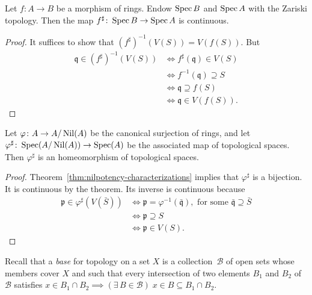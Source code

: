 \begin{thm}
    Let\/ $f\colon A\to B$ be a morphism of rings. Endow\/ $\operatorname{Spec} B$ and\/ $\operatorname{Spec} A$ with the Zariski topology. Then the map\/ $f^\sharp\colon\operatorname{Spec} B\to\operatorname{Spec} A$ is continuous.
\end{thm}

\begin{proof}
    It suffices to show that $(f^\sharp)^{-1}(V(S))=V(f(S))$. But
    \begin{align*}
        \mathfrak q\in(f^\sharp)^{-1}(V(S))
            &\iff f^\sharp(\mathfrak q)\in V(S)\\
            &\iff f^{-1}(\mathfrak q)\supseteq S\\
            &\iff \mathfrak q\supseteq f(S)\\
            &\iff \mathfrak q\in V(f(S)).
    \end{align*}
\end{proof}

\begin{cor}
    Let\/ $\varphi\colon A\to A/\operatorname{Nil}(A)$ be the canonical surjection of rings, and let\/ $\varphi^\sharp\colon\operatorname{Spec}(A/\operatorname{Nil}(A))\to\operatorname{Spec}(A)$ be the associated map of topological spaces. Then\/ $\varphi^\sharp$ is an homeomorphism of topological spaces.    
\end{cor}

\begin{proof}
    Theorem~\ref{thm:nilpotency-characterizations} implies that $\varphi^\sharp$ is a bijection. It is continuous by the theorem. Its inverse is continuous because
    \begin{align*}
        \mathfrak p\in\varphi^\sharp(V(\bar S))
            &\iff \mathfrak p=\varphi^{-1}(\bar{\mathfrak q}),
                \text{ for some }\bar{\mathfrak q}\supseteq\bar S\\
            &\iff \mathfrak p\supseteq S\\
            &\iff \mathfrak p\in V(S).
    \end{align*}
\end{proof}

\begin{rem}
    Recall that a \textsl{base} for topology on a set $X$ is a collection~$\mathcal B$ of open sets whose members cover $X$ and such that every intersection of two elements $B_1$ and $B_2$ of $\mathcal B$ satisfies $x\in B_1\cap B_2\implies (\exists\,B\in\mathcal B)\; x\in B\subseteq B_1\cap B_2$.
\end{rem}

